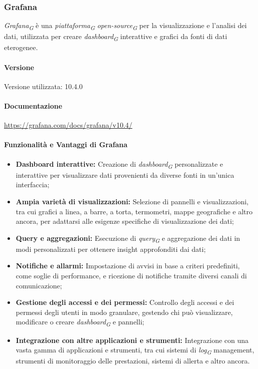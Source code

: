 \subsubsection{Grafana}
\textit{Grafana}\textsubscript{\textit{G}} è una \textit{piattaforma}\textsubscript{\textit{G}} \textit{open-source}\textsubscript{\textit{G}} per la visualizzazione e l'analisi dei dati, utilizzata per creare \textit{dashboard}\textsubscript{\textit{G}} interattive e grafici da fonti di dati eterogenee. 

\paragraph{Versione}
Versione utilizzata: 10.4.0

\paragraph{Documentazione}
\url{https://grafana.com/docs/grafana/v10.4/}

\paragraph{Funzionalità e Vantaggi di Grafana}
\begin{itemize}
    \item \textbf{Dashboard interattive:} Creazione di \textit{dashboard}\textsubscript{\textit{G}} personalizzate e interattive per visualizzare dati provenienti da diverse fonti in un'unica interfaccia;
        
    \item \textbf{Ampia varietà di visualizzazioni:} Selezione di pannelli e visualizzazioni, tra cui grafici a linea, a barre, a torta, termometri, mappe geografiche e altro ancora, per adattarsi alle esigenze specifiche di visualizzazione dei dati;
    
    \item \textbf{Query e aggregazioni:} Esecuzione di \textit{query}\textsubscript{\textit{G}} e aggregazione dei dati in modi personalizzati per ottenere insight approfonditi dai dati;
    
    \item \textbf{Notifiche e allarmi:} Impostazione di avvisi in base a criteri predefiniti, come soglie di performance, e ricezione di notifiche tramite diversi canali di comunicazione;
    
    \item \textbf{Gestione degli accessi e dei permessi:} Controllo degli accessi e dei permessi degli utenti in modo granulare, gestendo chi può visualizzare, modificare o creare \textit{dashboard}\textsubscript{\textit{G}} e pannelli;
    
    \item \textbf{Integrazione con altre applicazioni e strumenti:} Integrazione con una vasta gamma di applicazioni e strumenti, tra cui sistemi di \textit{log}\textsubscript{\textit{G}} management, strumenti di monitoraggio delle prestazioni, sistemi di allerta e altro ancora.
  \end{itemize}
  
